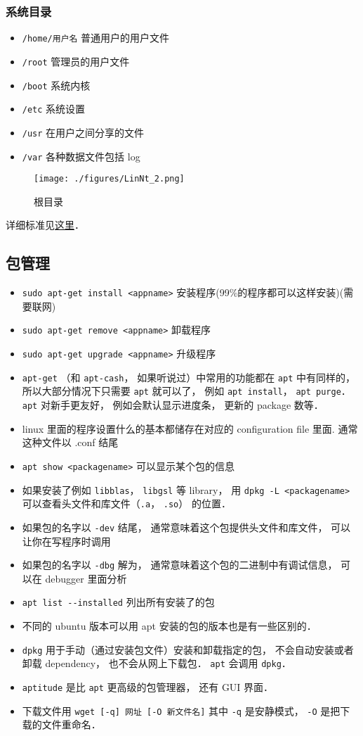 \subsubsection{系统目录}
\begin{itemize}
\item \verb|/home/用户名| 普通用户的用户文件
\item \verb|/root| 管理员的用户文件
\item \verb|/boot| 系统内核
\item \verb|/etc| 系统设置
\item \verb|/usr| 在用户之间分享的文件
\item \verb|/var| 各种数据文件包括 log
\end{itemize}
\begin{figure}[ht]
\centering
\texttt{[image: ./figures/LinNt\_2.png]}
\caption{根目录} \label{LinNt_fig2}
\end{figure}
详细标准见\href{https://www.pathname.com/fhs/}{这里}．

\subsection{包管理}
\begin{itemize}
\item \verb`sudo apt-get install <appname>` 安装程序(99\%的程序都可以这样安装)(需要联网)
\item \verb`sudo apt-get remove <appname>` 卸载程序
\item \verb`sudo apt-get upgrade <appname>` 升级程序
\item \verb`apt-get` （和 \verb`apt-cash`， 如果听说过）中常用的功能都在 \verb`apt` 中有同样的， 所以大部分情况下只需要 \verb`apt` 就可以了， 例如 \verb`apt install`， \verb`apt purge`． \verb`apt` 对新手更友好， 例如会默认显示进度条， 更新的 package 数等．
\item linux 里面的程序设置什么的基本都储存在对应的 configuration file 里面. 通常这种文件以 .conf 结尾
\item \verb`apt show <packagename>` 可以显示某个包的信息
\item 如果安装了例如 \verb`libblas`， \verb`libgsl` 等 library， 用 \verb`dpkg -L <packagename>` 可以查看头文件和库文件（\verb`.a`， \verb`.so`） 的位置．
\item 如果包的名字以 \verb`-dev` 结尾， 通常意味着这个包提供头文件和库文件， 可以让你在写程序时调用
\item 如果包的名字以 \verb`-dbg` 解为， 通常意味着这个包的二进制中有调试信息， 可以在 debugger 里面分析
\item \verb|apt list --installed| 列出所有安装了的包
\item 不同的 ubuntu 版本可以用 apt 安装的包的版本也是有一些区别的．
\item \verb|dpkg| 用于手动（通过安装包文件）安装和卸载指定的包， 不会自动安装或者卸载 dependency， 也不会从网上下载包． \verb|apt| 会调用 \verb|dpkg|．
\item \verb|aptitude| 是比 \verb|apt| 更高级的包管理器， 还有 GUI 界面．
\item 下载文件用 \verb|wget [-q] 网址 [-O 新文件名]| 其中 \verb|-q| 是安静模式， \verb|-O| 是把下载的文件重命名．
\end{itemize}

